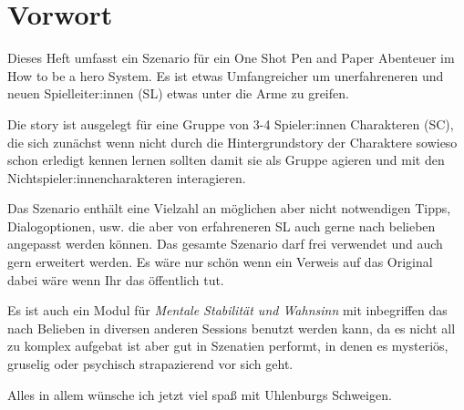 \chapter{Vorwort}
Dieses Heft umfasst ein Szenario für ein One Shot Pen and Paper Abenteuer im How to be a hero System. Es ist etwas Umfangreicher um unerfahreneren und neuen Spielleiter:innen (SL) etwas unter die Arme zu greifen.

Die story ist ausgelegt für eine Gruppe von 3-4 Spieler:innen Charakteren (SC), die sich zunächst wenn nicht durch die Hintergrundstory der Charaktere sowieso schon erledigt kennen lernen sollten damit sie als Gruppe agieren und mit den Nichtspieler:innencharakteren interagieren.

Das Szenario enthält eine Vielzahl an möglichen aber nicht notwendigen Tipps, Dialogoptionen, usw. die aber von erfahreneren SL auch gerne nach belieben angepasst werden können. Das gesamte Szenario darf frei verwendet und auch gern erweitert werden. Es wäre nur schön wenn ein Verweis auf das Original dabei wäre wenn Ihr das öffentlich tut.

Es ist auch ein Modul für \textit{Mentale Stabilität und Wahnsinn} mit inbegriffen das nach Belieben in diversen anderen Sessions benutzt werden kann, da es nicht all zu komplex aufgebat ist aber gut in Szenatien performt, in denen es mysteriös, gruselig oder psychisch strapazierend vor sich geht.

Alles in allem wünsche ich jetzt viel spaß mit Uhlenburgs Schweigen.